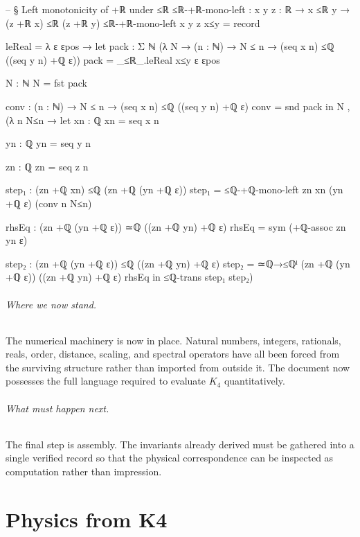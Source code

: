 \documentclass[11pt,a4paper]{book}
\def\texorpdfstring#1#2{#2}%
\begin{document}
\begin{code}
-- § Left monotonicity of +ℝ under ≤ℝ
≤ℝ-+ℝ-mono-left : {x y z : ℝ} → x ≤ℝ y → (z +ℝ x) ≤ℝ (z +ℝ y)
≤ℝ-+ℝ-mono-left {x} {y} {z} x≤y = record
  { leReal = λ ε εpos →
      let
        pack : Σ ℕ (λ N → (n : ℕ) → N ≤ n → (seq x n) ≤ℚ ((seq y n) +ℚ ε))
        pack = _≤ℝ_.leReal x≤y ε εpos

        N : ℕ
        N = fst pack

        conv : (n : ℕ) → N ≤ n → (seq x n) ≤ℚ ((seq y n) +ℚ ε)
        conv = snd pack
      in
      N , (λ n N≤n →
        let
          xn : ℚ
          xn = seq x n

          yn : ℚ
          yn = seq y n

          zn : ℚ
          zn = seq z n

          step₁ : (zn +ℚ xn) ≤ℚ (zn +ℚ (yn +ℚ ε))
          step₁ = ≤ℚ-+ℚ-mono-left zn xn (yn +ℚ ε) (conv n N≤n)

          rhsEq : (zn +ℚ (yn +ℚ ε)) ≃ℚ ((zn +ℚ yn) +ℚ ε)
          rhsEq = sym (+ℚ-assoc zn yn ε)

          step₂ : (zn +ℚ (yn +ℚ ε)) ≤ℚ ((zn +ℚ yn) +ℚ ε)
          step₂ = ≃ℚ→≤ℚˡ {(zn +ℚ (yn +ℚ ε))} {((zn +ℚ yn) +ℚ ε)} rhsEq
        in
        ≤ℚ-trans step₁ step₂)
  }
\end{code}

\paragraph{Where we now stand.}
The numerical machinery is now in place. Natural numbers, integers, rationals, reals, order, distance, scaling, and spectral operators have all been forced from the surviving structure rather than imported from outside it. The document now possesses the full language required to evaluate $K_4$ quantitatively.

\paragraph{What must happen next.}
The final step is assembly. The invariants already derived must be gathered into a single verified record so that the physical correspondence can be inspected as computation rather than impression.


\part{Physics from \texorpdfstring{$K_4$}{K4}}
\end{document}
